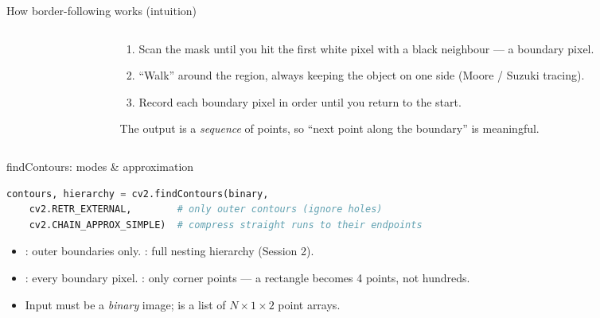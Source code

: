\documentclass[10pt,aspectratio=169]{beamer}
\begin{document}
\begin{frame}{How border-following works (intuition)}
  \begin{columns}[T]
    \begin{column}{0.52\textwidth}
    \begin{center}
    \end{center}
    \end{column}
    \begin{column}{0.48\textwidth}
      \begin{enumerate}\scriptsize
        \item Scan the mask until you hit the first white pixel with a black neighbour — a boundary pixel.
        \item ``Walk'' around the region, always keeping the object on one side (Moore / Suzuki tracing).
        \item Record each boundary pixel in order until you return to the start.
      \end{enumerate}
      \begin{infobox}
        The output is a \emph{sequence} of points, so ``next point along the boundary'' is meaningful.
      \end{infobox}
    \end{column}
  \end{columns}
\end{frame}

\begin{frame}[fragile]{findContours: modes \& approximation}
\begin{lstlisting}[language=Python]
contours, hierarchy = cv2.findContours(binary,
    cv2.RETR_EXTERNAL,        # only outer contours (ignore holes)
    cv2.CHAIN_APPROX_SIMPLE)  # compress straight runs to their endpoints
\end{lstlisting}
  \begin{itemize}
    \item {}: outer boundaries only. : full nesting hierarchy (Session 2).
    \item {}: every boundary pixel. : only corner points — a
          rectangle becomes 4 points, not hundreds.
    \item Input must be a \emph{binary} image;  is a list of $N\times1\times2$ point arrays.
  \end{itemize}
\end{frame}
\end{document}
